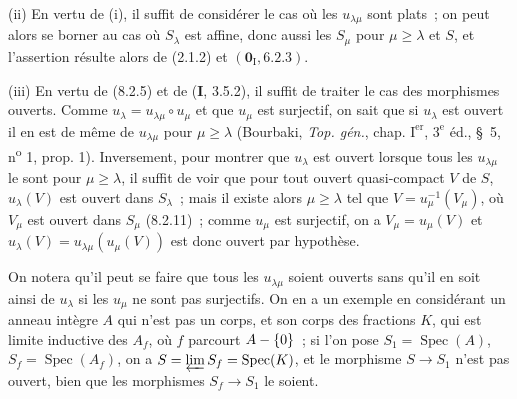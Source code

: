 \medskip
\noindent
(ii) En vertu de (i), il suffit de considérer le cas où les
$u_{\lambda\mu}$ sont plats~; on peut alors se borner au cas où $S_\lambda$
est affine, donc aussi les $S_\mu$ pour $\mu\geq\lambda$ et $S$, et
l'assertion résulte alors de (2.1.2) et $(\mathbf{0}_{\mathrm I},6.2.3)$.

\medskip
\noindent
(iii) En vertu de (8.2.5) et de (\textbf{I}, 3.5.2), il suffit de traiter le cas des
morphismes ouverts. Comme $u_\lambda=u_{\lambda\mu}\circ u_\mu$ et que
$u_\mu$ est surjectif, on sait que si $u_\lambda$ est ouvert il en est de
même de $u_{\lambda\mu}$ pour $\mu\geq\lambda$ (Bourbaki,
\emph{Top. gén.}, chap. $\mathrm I^{\mathrm{er}}$, $3^{\mathrm e}$ éd.,
\S~5, n\textsuperscript{o} 1, prop. 1).
Inversement, pour montrer que $u_\lambda$ est ouvert lorsque tous les
$u_{\lambda\mu}$ le sont pour $\mu\geq\lambda$, il suffit de voir que pour
tout ouvert quasi-compact $V$ de $S$, $u_\lambda(V)$ est ouvert dans
$S_\lambda$~; mais il existe alors $\mu\geq\lambda$ tel que
$V=u_\mu^{-1}(V_\mu)$, où $V_\mu$ est ouvert dans $S_\mu$ (8.2.11)~; comme
$u_\mu$ est surjectif, on a $V_\mu=u_\mu(V)$ et
$u_\lambda(V)=u_{\lambda\mu}(u_\mu(V))$ est donc ouvert par hypothèse.

On notera qu'il peut se faire que tous les $u_{\lambda\mu}$ soient ouverts
sans qu'il en soit ainsi de $u_\lambda$ si les $u_\mu$ ne sont pas
surjectifs. On en a un exemple en considérant un anneau intègre $A$ qui n'est
pas un corps, et son corps des fractions $K$, qui est limite inductive des
$A_f$, où $f$ parcourt $A-\{0\}$~; si l'on pose
$S_1=\operatorname{Spec}(A)$, $S_f=\operatorname{Spec}(A_f)$, on a
$S=\varprojlim S_f=\operatorname{Spec}(K)$, et le morphisme $S\to S_1$ n'est
pas ouvert, bien que les morphismes $S_f\to S_1$ le soient.

